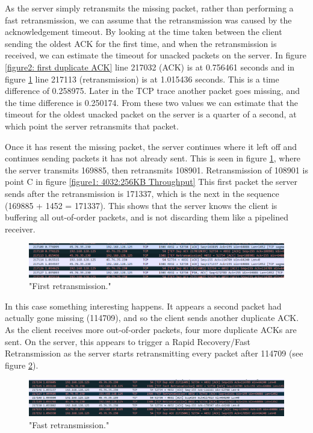 \documentclass[12pt]{article}
\begin{document}
As the server simply retransmits the missing packet, rather than performing a fast retransmission, we can assume that the retransmission was caused by the acknowledgement timeout.
By looking at the time taken between the client sending the oldest ACK for the first time, and when the retransmission is received, we can estimate the timeout for unacked packets on the server.
In figure \ref{figure2: first duplicate ACK} line 217032 (ACK) is at 0.756461 seconds and in figure \ref{figure4: First retransmission} line 217113 (retransmission) is at 1.015436 seconds.
This is a time difference of 0.258975.
Later in the TCP trace another packet goes missing, and the time difference is 0.250174.
From these two values we can estimate that the timeout for the oldest unacked packet on the server is a quarter of a second, at which point the server retransmits that packet.

Once it has resent the missing packet, the server continues where it left off and continues sending packets it has not already sent.
This is seen in figure \ref{figure4: First retransmission}, where the server transmits 169885, then retransmits 108901.
Retransmission of 108901 is point C in figure \ref{figure1: 4032:256KB Throughput}
This first packet the server sends after the retransmission is 171337, which is the next in the sequence (169885 + 1452 = 171337).
This shows that the server knows the client is buffering all out-of-order packets, and is not discarding them like a pipelined receiver.

\begin{figure}[!htbp]
  \centering
  \includegraphics[width=\linewidth]{4032-256KB-retransmission.PNG}
  \caption{"First retransmission."}
  \label{figure4: First retransmission}
\end{figure}

In this case something interesting happens.
It appears a second packet had actually gone missing (114709), and so the client sends another duplicate ACK.
As the client receives more out-of-order packets, four more duplicate ACKs are sent.
On the server, this appears to trigger a Rapid Recovery/Fast Retransmission as the server starts retransmitting every packet after 114709 (see figure \ref{figure4: Fast retransmission}).

\begin{figure}[!htbp]
  \centering
  \includegraphics[width=\linewidth]{4032-256KB-fast-retransmission.PNG}
  \caption{"Fast retransmission."}
  \label{figure4: Fast retransmission}
\end{figure}
\end{document}
